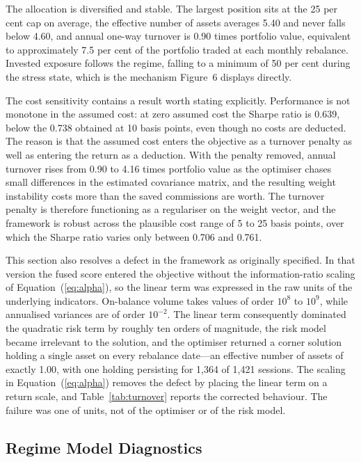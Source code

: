 The allocation is diversified and stable. The largest position sits at the 25 per cent
cap on average, the effective number of assets averages 5.40 and never falls below
4.60, and annual one-way turnover is 0.90 times portfolio value, equivalent to
approximately 7.5 per cent of the portfolio traded at each monthly rebalance. Invested
exposure follows the regime, falling to a minimum of 50 per cent during the stress
state, which is the mechanism Figure~6 displays directly.

The cost sensitivity contains a result worth stating explicitly. Performance is not
monotone in the assumed cost: at zero assumed cost the Sharpe ratio is 0.639, below the
0.738 obtained at 10 basis points, even though no costs are deducted. The reason is
that the assumed cost enters the objective as a turnover penalty as well as entering
the return as a deduction. With the penalty removed, annual turnover rises from
0.90 to 4.16 times portfolio value as the optimiser chases small differences in the
estimated covariance matrix, and the resulting weight instability costs more than the
saved commissions are worth. The turnover penalty is therefore functioning as a
regulariser on the weight vector, and the framework is robust across the plausible cost
range of 5 to 25 basis points, over which the Sharpe ratio varies only between 0.706
and 0.761.

This section also resolves a defect in the framework as originally specified. In that
version the fused score entered the objective without the information-ratio scaling of
Equation~(\ref{eq:alpha}), so the linear term was expressed in the raw units of the
underlying indicators. On-balance volume takes values of order $10^{8}$ to $10^{9}$,
while annualised variances are of order $10^{-2}$. The linear term consequently
dominated the quadratic risk term by roughly ten orders of magnitude, the risk model
became irrelevant to the solution, and the optimiser returned a corner solution holding
a single asset on every rebalance date---an effective number of assets of exactly 1.00,
with one holding persisting for 1{,}364 of 1{,}421 sessions. The scaling in
Equation~(\ref{eq:alpha}) removes the defect by placing the linear term on a return
scale, and Table~\ref{tab:turnover} reports the corrected behaviour. The failure was one of units, not
of the optimiser or of the risk model.

\subsection{Regime Model Diagnostics}
\label{sec:regimefit}

